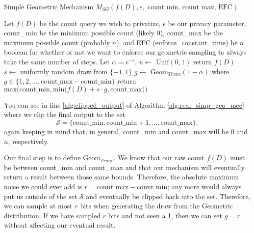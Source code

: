 \documentclass[11pt]{scrartcl} %
\begin{document}
\begin{algorithm}[H]
    \caption{Simple Geometric Mechanism $M_{SG}(f(D), \epsilon, \text{ count\_min, count\_max, EFC})$}
    \label{alg:real_simp_geo_mec}
    \begin{algorithmic}[1]
        \State Let $f(D)$ be the count query we wish to privatize, $\epsilon$ be our privacy parameter, count\_min be the minimum
        possible count (likely 0), count\_max be the maximum possible count (probably $n$), and EFC (enforce\_constant\_time) be a boolean
        for whether or not we want to enforce our geometric sampling to always take the same number of steps.
        \State Let $\alpha = e^{-\epsilon}$.
        \State $u \gets$ Unif$(0,1)$
            \State return $f(D)$
        \Else
            \State $s \gets$ uniformly random draw from $\{-1, 1\}$
            \State $g \gets$ $\text{Geom}_{Trunc}(1 - \alpha)$ where $g \in \{1,2,\hdots, \text{count\_max} - \text{count\_min}\}$
            \State return $\text{max}\bigg( \text{count\_min}, \text{min}\big(f(D) + s \cdot g, \text{count\_max}\big) \bigg)$ \label{alg:clipped_output}
        \EndIf
	\end{algorithmic}
\end{algorithm}
You can see in line \ref{alg:clipped_output} of Algorithm \ref{alg:real_simp_geo_mec} where we clip the final output
to the set
\[ \mathcal{S} = \{\text{count\_min}, \text{count\_min} + 1, \hdots, \text{count\_max}\}, \]
again keeping in mind that, in general, count\_min and count\_max will be $0$ and $n$, respectively. \newline

Our final step is to define Geom$_{Trunc}$. We know that our raw count $f(D)$ must be between count\_min and count\_max
and that our mechanism will eventually return a result between those same bounds. Therefore, the absolute maximum noise
we could ever add is $r = \text{count\_max} - \text{count\_min}$; any more would always put us outside of the set $\mathcal{S}$
and eventually be clipped back into the set. Therefore, we can sample at most $r$ bits when generating the draw
from the Geometric distribution. If we have sampled $r$ bits and not seen a 1, then we can set $g = r$ without
affecting our eventual result.



\end{document}
